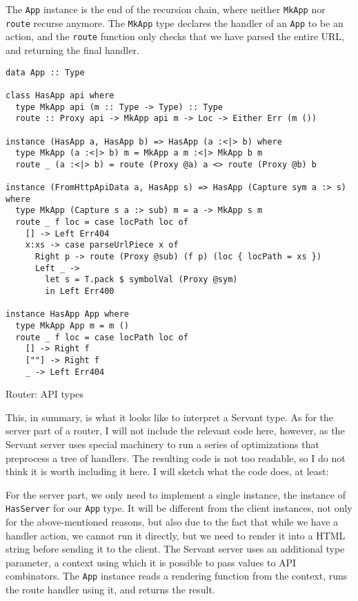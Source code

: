 \documentclass[english,odsaz]{fitthesis}
\begin{document}
The \texttt{App} instance is the end of the recursion chain, where neither \texttt{MkApp} nor
\texttt{route} recurse anymore. The \texttt{MkApp} type declares the handler of an \texttt{App} to be an
action, and the \texttt{route} function only checks that we have parsed the entire URL,
and returning the final handler.

\begin{listing}[htbp]
\begin{verbatim}
data App :: Type

class HasApp api where
  type MkApp api (m :: Type -> Type) :: Type
  route :: Proxy api -> MkApp api m -> Loc -> Either Err (m ())

instance (HasApp a, HasApp b) => HasApp (a :<|> b) where
  type MkApp (a :<|> b) m = MkApp a m :<|> MkApp b m
  route _ (a :<|> b) = route (Proxy @a) a <> route (Proxy @b) b

instance (FromHttpApiData a, HasApp s) => HasApp (Capture sym a :> s) where
  type MkApp (Capture s a :> sub) m = a -> MkApp s m
  route _ f loc = case locPath loc of
    [] -> Left Err404
    x:xs -> case parseUrlPiece x of
      Right p -> route (Proxy @sub) (f p) (loc { locPath = xs })
      Left _ ->
        let s = T.pack $ symbolVal (Proxy @sym)
        in Left Err400

instance HasApp App where
  type MkApp App m = m ()
  route _ f loc = case locPath loc of
    [] -> Right f
    [""] -> Right f
    _ -> Left Err404
\end{verbatim}
\caption{Router: API types \label{router-hasapp}}
\end{listing}

This, in summary, is what it looks like to interpret a Servant type. As for the
server part of a router, I will not include the relevant code here, however, as
the Servant server uses special machinery to run a series of optimizations that
preprocess a tree of handlers. The resulting code is not too readable, so I do
not think it is worth including it here. I will sketch what the code does, at least:

For the server part, we only need to implement a single instance, the instance
of \texttt{HasServer} for our \texttt{App} type. It will be different from the client instances,
not only for the above-mentioned reasons, but also due to the fact that while we
have a handler action, we cannot run it directly, but we need to render it into
a HTML string before sending it to the client. The Servant server uses an
additional type parameter, a context using which it is possible to pass values
to API combinators. The \texttt{App} instance reads a rendering function from the
context, runs the route handler using it, and returns the result.
\end{document}

